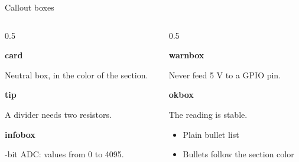 \documentclass[aspectratio=169,12pt,t]{beamer}
\begin{document}
\begin{frame}{Callout boxes}
  \small
  \begin{columns}[T,onlytextwidth]
    \begin{column}{0.5\textwidth}
      \begin{card}
        {\bfseries\color{accent}card}\par\smallskip
        Neutral box, in the color of the section.
      \end{card}
      \vspace{0.2cm}
      \begin{tip}
        {\bfseries tip}\par\smallskip
        A divider needs two resistors.
      \end{tip}
      \vspace{0.2cm}
      \begin{infobox}
        {\bfseries infobox}\par{}-bit ADC: values from 0 to 4095.
      \end{infobox}
    \end{column}
    \begin{column}{0.5\textwidth}
      \begin{warnbox}
        {\bfseries warnbox}\par\smallskip
        Never feed 5 V to a GPIO pin.
      \end{warnbox}
      \vspace{0.2cm}
      \begin{okbox}
        {\bfseries okbox}\par\smallskip
        The reading is stable.
      \end{okbox}
      \vspace{0.2cm}
      \begin{itemize}
        \item Plain bullet list
        \item Bullets follow the section color
      \end{itemize}
    \end{column}
  \end{columns}
\end{frame}
\end{document}
